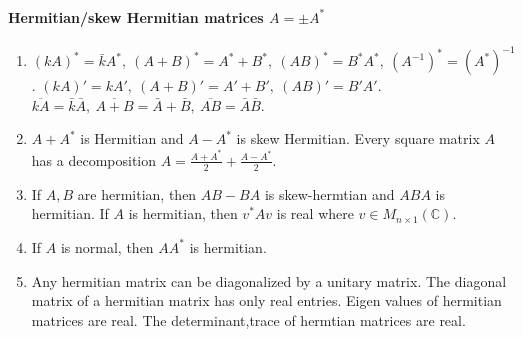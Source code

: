 \paragraph{Hermitian/skew Hermitian matrices $A = \pm A^\ast$}
\begin{enumerate}
	\item $(kA)^\ast = \bar{k}A^\ast,\ (A+B)^\ast = A^\ast + B^\ast,\ (AB)^\ast = B^\ast A^\ast,\ (A^{-1})^\ast = (A^\ast)^{-1}$.
		\subitem $(kA)' = kA',\ (A+B)' = A'+B',\ (AB)' = B'A'$.
		\subitem $\overline{kA} = \bar{k} \bar{A},\ \overline{A+B} = \bar{A} + \bar{B},\ \overline{AB} = \bar{A}\bar{B}$.
	\item $A+A^\ast$ is Hermitian and $A-A^\ast$ is skew Hermitian.
		\subitem Every square matrix $A$ has a decomposition $A = \frac{A+A^\ast}{2} + \frac{A-A^\ast}{2}$.
	\item If $A,B$ are hermitian, then $AB-BA$ is skew-hermtian and $ABA$ is hermitian.
		\subitem If $A$ is hermitian, then $v^\ast A v$ is real where $v \in M_{n \times 1}(\mathbb{C})$.
	\item If $A$ is normal, then $AA^\ast$ is hermitian.
	\item Any hermitian matrix can be diagonalized by a unitary matrix.
		The diagonal matrix of a hermitian matrix has only real entries.
		Eigen values of hermitian matrices are real.
		\subitem The determinant,trace of hermtian matrices are real.
\end{enumerate}
